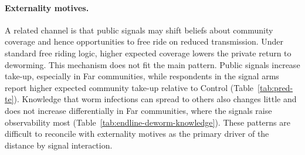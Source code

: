 \documentclass[ECM\space ReStud.tex]{subfiles}
\begin{document}
\paragraph{Externality motives.} A related channel is that public signals may shift beliefs about community coverage and hence opportunities to free ride on reduced transmission. Under standard free riding logic, higher expected coverage lowers the private return to deworming. This mechanism does not fit the main pattern. Public signals increase take-up, especially in Far communities, while respondents in the signal arms report higher expected community take-up relative to Control (Table~\ref{tab:pred-te}). Knowledge that worm infections can spread to others also changes little and does not increase differentially in Far communities, where the signals raise observability most (Table~\ref{tab:endline-deworm-knowledge}). These patterns are difficult to reconcile with externality motives as the primary driver of the distance by signal interaction. %


\end{document}
